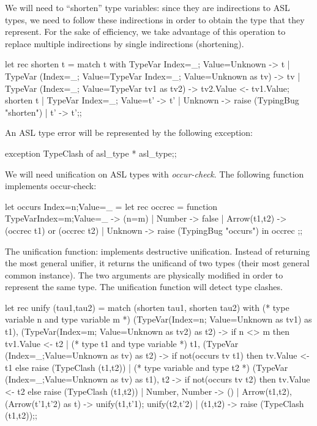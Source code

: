 We will need to ``shorten'' type variables: since they are indirections to ASL
types, we need to follow these indirections in order to obtain the
type that they represent. For the sake of efficiency, we take
advantage of this operation to replace multiple indirections by single
indirections (shortening).
\begin{caml_example}
let rec shorten t =
    match t with
     TypeVar {Index=_; Value=Unknown} -> t
   | TypeVar ({Index=_;
                Value=TypeVar {Index=_;
                               Value=Unknown} as tv}) -> tv
   | TypeVar ({Index=_; Value=TypeVar tv1} as tv2)
            -> tv2.Value <- tv1.Value; shorten t
   | TypeVar {Index=_; Value=t'} -> t'
   | Unknown -> raise (TypingBug "shorten")
   | t' -> t';;
\end{caml_example}
An ASL type error will be represented by the following exception:
\begin{caml_example}
exception TypeClash of asl_type * asl_type;;
\end{caml_example}
%
We will need unification on ASL types with {\em occur-check}.
The following function implements occur-check:
\begin{caml_example}
let occurs {Index=n;Value=_} =
  let rec occrec = function
        TypeVar{Index=m;Value=_} -> (n=m)
      | Number -> false
      | Arrow(t1,t2) -> (occrec t1) or (occrec t2)
      | Unknown -> raise (TypingBug "occurs")
  in occrec
;;
\end{caml_example}
%
The unification function: implements destructive unification. Instead of
returning the most general unifier, it returns the unificand of two types
(their most general common instance). The two arguments are physically
modified in order to represent the same type. The unification function will
detect type clashes.
\begin{caml_example}
let rec unify (tau1,tau2) =
  match (shorten tau1, shorten tau2)
  with (* type variable n and type variable m *)
       (TypeVar({Index=n; Value=Unknown} as tv1) as t1),
       (TypeVar({Index=m; Value=Unknown} as tv2) as t2)
           -> if n <> m then tv1.Value <- t2
     | (* type t1 and type variable *)
      t1, (TypeVar ({Index=_;Value=Unknown} as tv) as t2)
            -> if not(occurs tv t1) then tv.Value <- t1
               else raise (TypeClash (t1,t2))
     | (* type variable and type t2 *)
       (TypeVar ({Index=_;Value=Unknown} as tv) as t1), t2
            -> if not(occurs tv t2) then tv.Value <- t2
               else raise (TypeClash (t1,t2))
     | Number, Number -> ()
     | Arrow(t1,t2), (Arrow(t'1,t'2) as t)
            -> unify(t1,t'1); unify(t2,t'2)
     | (t1,t2) -> raise (TypeClash (t1,t2));;
\end{caml_example}

